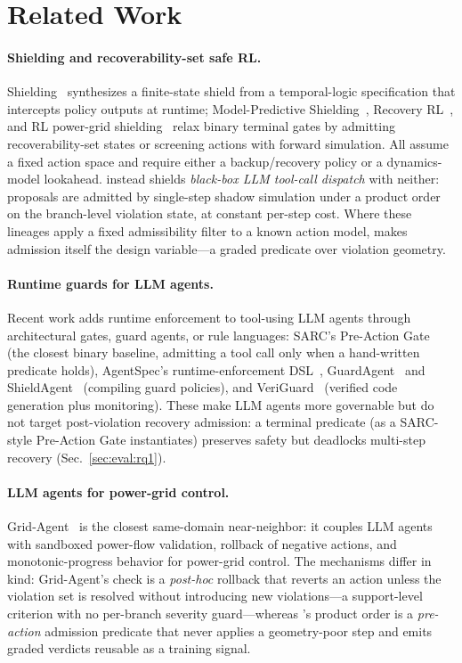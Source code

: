 \section{Related Work}
\label{sec:related}

\paragraph{Shielding and recoverability-set safe RL.}
Shielding~\cite{alshiekh2018safe} synthesizes a finite-state shield from a temporal-logic specification that intercepts policy outputs at runtime; Model-Predictive Shielding~\cite{bastani2019mps}, Recovery RL~\cite{thananjeyan2021recovery}, and RL power-grid shielding~\cite{hrlshield2026} relax binary terminal gates by admitting recoverability-set states or screening actions with forward simulation. All assume a fixed action space and require either a backup/recovery policy or a dynamics-model lookahead. \silr{} instead shields \emph{black-box LLM tool-call dispatch} with neither: proposals are admitted by single-step shadow simulation under a product order on the branch-level violation state, at constant per-step cost. Where these lineages apply a fixed admissibility filter to a known action model, \silr{} makes admission itself the design variable---a graded predicate over violation geometry.

\paragraph{Runtime guards for LLM agents.}
Recent work adds runtime enforcement to tool-using LLM agents through architectural gates, guard agents, or rule languages: SARC's Pre-Action Gate~\cite{sarc2026} (the closest binary baseline, admitting a tool call only when a hand-written predicate holds), AgentSpec's runtime-enforcement DSL~\cite{agentspec2026}, GuardAgent~\cite{guardagent2025} and ShieldAgent~\cite{shieldagent2025} (compiling guard policies), and VeriGuard~\cite{veriguard2025} (verified code generation plus monitoring). These make LLM agents more governable but do not target post-violation recovery admission: a terminal predicate (as a SARC-style Pre-Action Gate instantiates) preserves safety but deadlocks multi-step recovery (Sec.~\ref{sec:eval:rq1}).

\paragraph{LLM agents for power-grid control.}
Grid-Agent~\cite{gridagent2025} is the closest same-domain near-neighbor: it couples LLM agents with sandboxed power-flow validation, rollback of negative actions, and monotonic-progress behavior for power-grid control. The mechanisms differ in kind: Grid-Agent's check is a \emph{post-hoc} rollback that reverts an action unless the violation set is resolved without introducing new violations---a support-level criterion with no per-branch severity guard---whereas \silr{}'s product order is a \emph{pre-action} admission predicate that never applies a geometry-poor step and emits graded verdicts reusable as a training signal.

